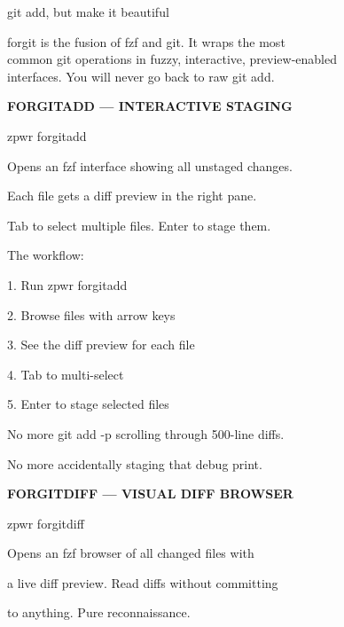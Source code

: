 \documentclass[11pt,a4paper,twoside]{book}
\begin{document}
git add, but make it beautiful

\begin{codebox}
forgit is the fusion of fzf and git. It wraps the most\\
common git operations in fuzzy, interactive, preview-enabled\\
interfaces. You will never go back to raw git add.\\
\end{codebox}


\vspace{12pt}
{\bfseries\color{neonyellow} FORGITADD — INTERACTIVE STAGING}\vspace{4pt}

\begin{codebox}
zpwr forgitadd\\
\end{codebox}

Opens an fzf interface showing all unstaged changes.

Each file gets a diff preview in the right pane.

Tab to select multiple files. Enter to stage them.

The workflow:

\begin{codebox}
1. Run zpwr forgitadd\\
\end{codebox}

2. Browse files with arrow keys

3. See the diff preview for each file

4. Tab to multi-select

5. Enter to stage selected files

No more git add -p scrolling through 500-line diffs.

No more accidentally staging that debug print.


\vspace{12pt}
{\bfseries\color{neonyellow} FORGITDIFF — VISUAL DIFF BROWSER}\vspace{4pt}

\begin{codebox}
zpwr forgitdiff\\
\end{codebox}

Opens an fzf browser of all changed files with

a live diff preview. Read diffs without committing

to anything. Pure reconnaissance.
\end{document}
